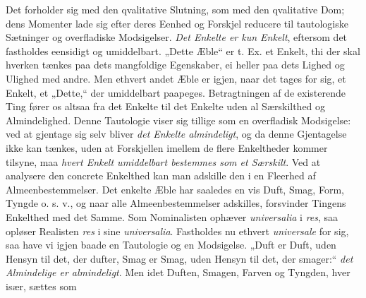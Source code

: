 \documentclass[12pt]{book}
\begin{document}
Det forholder sig med den qvalitative Slutning, som med den qvalitative Dom; dens
Momenter lade sig efter deres Eenhed og Forskjel reducere til tautologiske Sætninger
og overfladiske Modsigelser. \emph{Det Enkelte er kun Enkelt}, eftersom det
fastholdes eensidigt og umiddelbart. „Dette Æble“ er t. Ex. et Enkelt, thi der skal
hverken tænkes paa dets mangfoldige Egenskaber, ei heller paa dets Lighed og Ulighed
med andre. Men ethvert andet Æble er igjen, naar det tages for sig, et Enkelt, et
„Dette,“ der umiddelbart paapeges. Betragtningen af de existerende Ting fører os
altsaa fra det Enkelte til det Enkelte uden al Særskilthed og Almindelighed. Denne
Tautologie viser sig tillige som en overfladisk Modsigelse: ved at gjentage sig selv
bliver \emph{det Enkelte almindeligt}, og da denne Gjentagelse ikke kan tænkes, uden
at Forskjellen imellem de flere Enkeltheder kommer tilsyne, maa \emph{hvert Enkelt
umiddelbart bestemmes som et Særskilt}. Ved at analysere den concrete Enkelthed kan
man adskille den i en Fleerhed af Almeenbestemmelser. Det enkelte Æble har saaledes
en vis Duft, Smag, Form, Tyngde o. s. v., og naar alle Almeenbestemmelser adskilles,
forsvinder Tingens Enkelthed med det Samme. Som Nominalisten ophæver
\textit{universalia} i \textit{res}, saa opløser Realisten \textit{res} i sine
\textit{universalia}. Fastholdes nu ethvert \textit{universale} for sig, saa have vi
igjen baade en Tautologie og en Modsigelse. „Duft er Duft, uden Hensyn til det, der
dufter, Smag er Smag, uden Hensyn til det, der smager:“ \emph{det Almindelige er
almindeligt}. Men idet Duften, Smagen, Farven og Tyngden, hver især, sættes som
\end{document}
